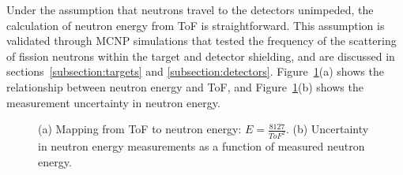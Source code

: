 Under the assumption that neutrons travel to the detectors unimpeded, the calculation of neutron energy from ToF is straightforward.
This assumption is validated through MCNP simulations that tested the frequency of the scattering of fission neutrons within the target and detector shielding, and are discussed in sections~\ref{subsection:targets} and \ref{subsection:detectors}.
Figure~\ref{fig:ErgUncertainty}(a) shows the relationship between neutron energy and ToF, and Figure~\ref{fig:ErgUncertainty}(b) shows the measurement uncertainty in neutron energy.
\begin{figure}[]
    \caption{(a) Mapping from ToF to neutron energy: $E = \frac{8127}{ToF^{2}}$.
    (b) Uncertainty in neutron energy measurements as a function of measured neutron energy.}
    \label{fig:ErgUncertainty}
\end{figure}


